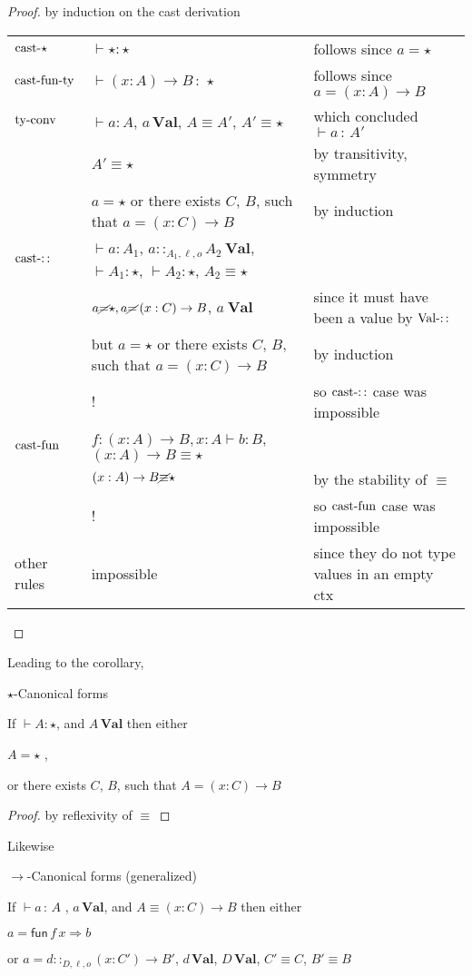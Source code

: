\begin{proof}
by induction on the cast derivation

\begin{tabular}{lll}
$\operatorname{cast-\star}$ & $\vdash\star:\star$ & follows since $a=\star$\tabularnewline
$\operatorname{cast-fun-ty}$ & $\vdash\left(x:A\right)\rightarrow B\,:\,\star$ & follows since $a=\left(x:A\right)\rightarrow B$\tabularnewline
$\operatorname{ty-conv}$ & $\vdash a:A$, $a\,\textbf{Val}$, $A\equiv A'$, $A'\equiv\star$ & which concluded $\vdash a\,:\,A'$\tabularnewline
 & $A'\equiv\star$ & by transitivity, symmetry\tabularnewline
 & $a=\star$ or there exists $C$, $B$, such that $a=\left(x:C\right)\rightarrow B$  & by induction\tabularnewline
$\operatorname{cast-::}$ & $\vdash a:A_{1}$, $a::_{A_{1},\ell ,o}A_{2}\:\textbf{Val}$,$\vdash A_{1}:\star$,
$\vdash A_{2}:\star$, $A_{2}\equiv\star$ & \tabularnewline
 & $a\cancel{=}\star,a\cancel{=}\left(x:C\right)\rightarrow B$, $a\:\textbf{Val}$ & since it must have been a value by $\operatorname{Val-::}$ \tabularnewline
 & but $a=\star$ or there exists $C$, $B$, such that $a=\left(x:C\right)\rightarrow B$  & by induction \tabularnewline
 & ! & so $\operatorname{cast-::}$ case was impossible\tabularnewline
$\operatorname{cast-fun}$ & $f:\left(x:A\right)\rightarrow B,x:A\vdash b:B$, $\left(x:A\right)\rightarrow B\equiv\star$ & \tabularnewline
 & $\left(x:A\right)\rightarrow B\cancel{\equiv}\star$ & by the stability of $\equiv$\tabularnewline
 & ! & so $\operatorname{cast-fun}$ case was impossible\tabularnewline
other rules & impossible & since they do not type values in an empty ctx\tabularnewline
\end{tabular}
\end{proof}
Leading to the corollary,
\begin{cor}
$\star$-Canonical forms

If $\vdash A:\star$, and $A\,\textbf{Val}$ then either 

\textup{$A=\star$ , }

\textup{or there exists $C$, $B$, such that $A=\left(x:C\right)\rightarrow B$}
\end{cor}

\begin{proof}
by reflexivity of $\equiv$
\end{proof}
Likewise
\begin{lem}
$\rightarrow$-Canonical forms (generalized)

If $\vdash a\,:\,A$ , $a\,\textbf{Val}$, and $A\equiv\left(x:C\right)\rightarrow B$
then either

$a=\mathsf{fun}\,f\,x\Rightarrow b$ 

or $a=d::_{D,\ell ,o}\left(x:C'\right)\rightarrow B'$,
$d\,\textbf{Val}$, $D\,\textbf{Val}$, $C'\equiv C$, $B'\equiv B$ 
\end{lem}

